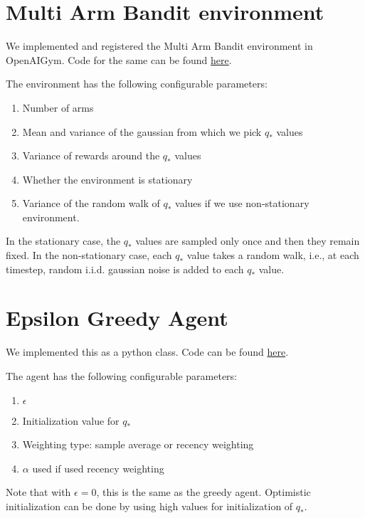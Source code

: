 \documentclass{article}
\begin{document}
\section{Multi Arm Bandit environment}

We implemented and registered the Multi Arm Bandit environment in OpenAIGym. Code for the same can be found \href{https://github.com/ashuven63/gym/blob/master/gym/envs/multiarm_bandit/multiarm_bandit.py}{here}.

The environment has the following configurable parameters:
\begin{enumerate}
    \item  Number of arms
    \item Mean and variance of the gaussian from which we pick $q_*$ values
    \item Variance of rewards around the $q_*$ values
    \item Whether the environment is stationary
    \item Variance of the random walk of $q_*$ values if we use non-stationary environment.
\end{enumerate}

In the stationary case, the $q_*$ values are sampled only once and then they remain fixed. In the non-stationary case, each $q_*$ value takes a random walk, i.e., at each timestep, random i.i.d. gaussian noise is added to each $q_*$ value.

\section{Epsilon Greedy Agent}

We implemented this as a python class. Code can be found \href{https://github.com/ashuven63/gym/blob/master/examples/agents/epsilon_greedy_agent.py}{here}.

The agent has the following configurable parameters:

\begin{enumerate}
    \item $\epsilon$
    \item Initialization value for $q_*$
    \item Weighting type: sample average or recency weighting
    \item $\alpha$ used if used recency weighting
\end{enumerate}

Note that with $\epsilon=0$, this is the same as the greedy agent. Optimistic initialization can be done by using high values for initialization of $q_*$.
\end{document}
